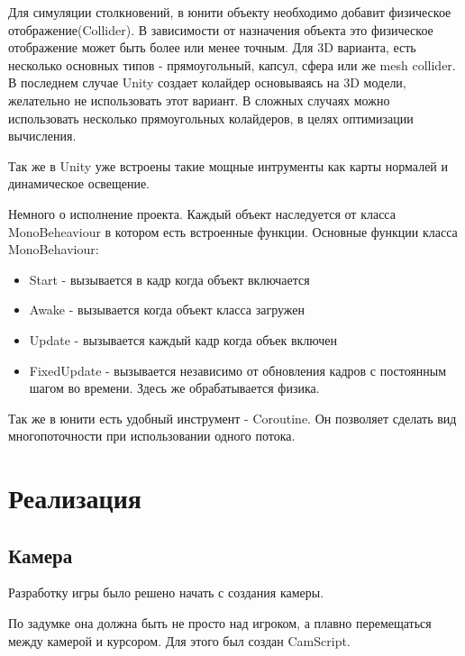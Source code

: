 \documentclass[14pt, titlepage,fleqn,a4paper]{extarticle}
\begin{document}
	Для симуляции столкновений, в юнити объекту необходимо добавит физическое отображение(Collider). В зависимости от назначения объекта это физическое отображение может быть более или менее точным. Для 3D варианта, есть несколько основных типов - прямоугольный, капсул, сфера или же mesh collider. В последнем случае Unity  создает колайдер основываясь на 3D модели, желательно не использовать этот вариант. В сложных случаях можно использовать несколько прямоугольных колайдеров, в целях оптимизации вычисления.

Так же в Unity уже встроены такие мощные интрументы как карты нормалей и динамическое освещение.

Немного о исполнение проекта. Каждый объект наследуется от класса MonoBeheaviour в котором есть встроенные функции.
	Основные функции класса MonoBehaviour:
	\begin{itemize}
	\item Start - вызывается в кадр когда объект включается 
	\item Awake - вызывается когда объект класса загружен
	\item Update - вызывается каждый кадр когда объек включен
	\item FixedUpdate - вызывается независимо от обновления кадров с постоянным шагом во времени. Здесь же обрабатывается физика.
    \end{itemize}
Так же в юнити есть удобный инструмент - Coroutine. Он позволяет сделать вид многопоточности при использовании одного потока.

    \section*{Реализация}
	\subsection*{Камера}
	Разработку игры было решено начать с создания камеры. 
	
	По задумке она должна быть не просто над игроком, а плавно перемещаться между камерой и курсором. Для этого был создан CamScript.
\end{document}
